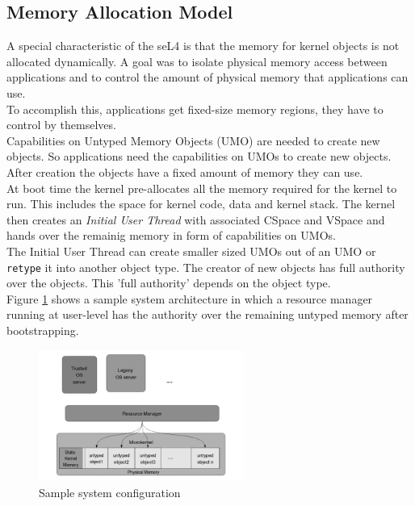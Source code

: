 \subsection{Memory Allocation Model} 
A special characteristic of the seL4 is that the memory for kernel objects is not allocated dynamically. A goal was to isolate physical memory access between applications and to control the amount of physical memory that applications can use. \\
To accomplish this, applications get fixed-size memory regions, they have to control by themselves. \\
Capabilities on Untyped Memory Objects (UMO) are needed to create new objects. So applications need the capabilities on UMOs to create new objects. After creation the objects have a fixed amount of memory they can use. \\
At boot time the kernel pre-allocates all the memory required for the kernel to run. This includes the space for kernel code, data and kernel stack. The kernel then creates an \textit{Initial User Thread} with associated CSpace and VSpace and hands over the remainig memory in form of capabilities on UMOs. \\
The Initial User Thread can create smaller sized UMOs out of an UMO or \texttt{retype} it into another object type. The creator of new objects has full authority over the objects. This 'full authority' depends on the object type. \\
Figure \ref{fig:systarch} shows a sample system architecture in which a resource manager running at user-level  has the authority over the remaining untyped memory after bootstrapping. 
	
	\begin{figure}[H]
	\centering
		\includegraphics[width=0.6\textwidth]{./Pictures/MemoryAllocation.png}
	\caption[Sample system architecture]{Sample system configuration \cite{TakeG}}
	\label{fig:systarch}
	\end{figure}	